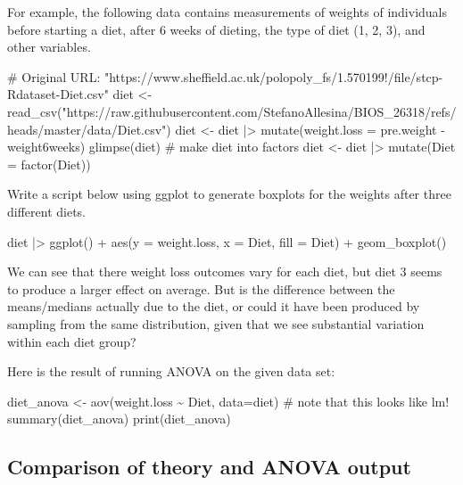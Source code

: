 \documentclass[
  letterpaper,
  DIV=11,
  numbers=noendperiod]{scrreprt}
\newenvironment{Shaded}{\begin{snugshade}}{\end{snugshade}}
\newcommand{\NormalTok}[1]{\textcolor[rgb]{0.00,0.23,0.31}{#1}}
\begin{document}
For example, the following data contains measurements of weights of
individuals before starting a diet, after 6 weeks of dieting, the type
of diet (1, 2, 3), and other variables.

\begin{Shaded}
\begin{Highlighting}[]
\NormalTok{\# Original URL: "https://www.sheffield.ac.uk/polopoly\_fs/1.570199!/file/stcp{-}Rdataset{-}Diet.csv"}
\NormalTok{diet \textless{}{-} read\_csv("https://raw.githubusercontent.com/StefanoAllesina/BIOS\_26318/refs/heads/master/data/Diet.csv") }
\NormalTok{diet \textless{}{-} diet |\textgreater{} mutate(weight.loss = pre.weight {-} weight6weeks) }
\NormalTok{glimpse(diet)}
\NormalTok{\# make diet into factors}
\NormalTok{diet \textless{}{-} diet |\textgreater{} mutate(Diet = factor(Diet))}
\end{Highlighting}
\end{Shaded}

Write a script below using ggplot to generate boxplots for the weights
after three different diets.

\begin{Shaded}
\begin{Highlighting}[]
\NormalTok{diet |\textgreater{} ggplot() + }
\NormalTok{  aes(y = weight.loss, }
\NormalTok{      x = Diet, }
\NormalTok{      fill = Diet) + }
\NormalTok{  geom\_boxplot()}
\end{Highlighting}
\end{Shaded}

We can see that there weight loss outcomes vary for each diet, but diet
3 seems to produce a larger effect on average. But is the difference
between the means/medians actually due to the diet, or could it have
been produced by sampling from the same distribution, given that we see
substantial variation within each diet group?

Here is the result of running ANOVA on the given data set:

\begin{Shaded}
\begin{Highlighting}[]
\NormalTok{diet\_anova  \textless{}{-}  aov(weight.loss \textasciitilde{} Diet, data=diet) \# note that this looks like lm!}
\NormalTok{summary(diet\_anova)}
\NormalTok{print(diet\_anova)}
\end{Highlighting}
\end{Shaded}

\subsection{Comparison of theory and ANOVA
output}\label{comparison-of-theory-and-anova-output}
\end{document}
